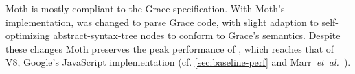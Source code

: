 Moth is mostly compliant to the Grace specification.
With Moth's implementation,
\SOMns was changed to parse Grace code,
with slight adaption to self-optimizing abstract-syntax-tree nodes
to conform to Grace's semantics.
Despite these changes Moth
preserves the peak performance of \SOMns,
which reaches that of V8,
Google's JavaScript implementation
(cf. \cref{sec:baseline-perf} and Marr~\textit{et~al.}~\cite{Marr2016}).



%



